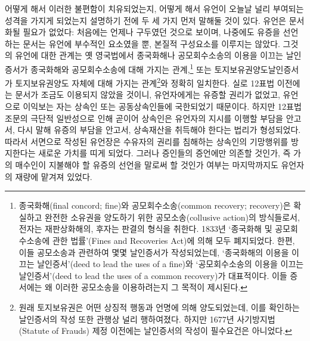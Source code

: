 어떻게 해서 이러한 불편함이 치유되었는지,
어떻게 해서 유언이 오늘날 널리 부여되는 성격을 가지게 되었는지
설명하기 전에
두 세 가지 먼저 말해둘 것이 있다.
유언은 문서화될 필요가 없었다:
처음에는 언제나 구두였던 것으로 보이며,
나중에도 유증을 선언하는 문서는 유언에 부수적인 요소였을 뿐,
본질적 구성요소를 이루지는 않았다.
그것의 유언에 대한 관계는
옛 영국법에서
종국화해나
공모회수소송의
이용을 이끄는 날인증서가
종국화해와
공모회수소송에
대해 가지는 관계,\footnote{%
  종국화해(final concord; fine)와 공모회수소송(common recovery; recovery)은
  확실하고 완전한 소유권을 양도하기 위한
  공모소송(collusive action)의 방식들로서,
  전자는 재판상화해의, 후자는 판결의 형식을 취한다.
  1833년 `종국화해 및 공모회수소송에 관한 법률'(Fines and Recoveries Act)에
  의해 모두 폐지되었다.
  한편, 이들 공모소송과 관련하여 몇몇 날인증서가 작성되었는데,
  `종국화해의 이용을 이끄는 날인증서'(deed to lead the uses of a fine)와
  `공모회수소송의 이용을 이끄는
  날인증서'(deed to lead the uses of a common recovery)가 대표적이다.
  이들 증서에는 왜 이러한 공모소송을 이용하려는지 그 목적이 제시된다.
}
또는
토지보유권양도날인증서가
토지보유권양도 자체에 대해 가지는 관계\footnote{%
  원래 토지보유권은 어떤 상징적 행동과 언명에 의해 양도되었는데,
  이를 확인하는 날인증서의 작성 또한 관행상 널리 행하여졌다.
  하지만 1677년 사기방지법(Statute of Frauds) 제정 이전에는
  날인증서의 작성이 필수요건은 아니었다.
}와
정확히 일치한다.
실로 12표법 이전에는 문서가 조금도 이용되지 않았을 것이니,
유언자에게는 유증할 권리가 없었고,
유언으로 이익보는 자는 상속인 또는 공동상속인들에 국한되었기 때문이다.
하지만 12표법 조문의 극단적 일반성으로 인해
곧이어
상속인은 유언자의 지시를 이행할 부담을 안고서,
다시 말해 유증의 부담을 안고서,
상속재산을 취득해야 한다는 법리가
형성되었다.
따라서 서면으로 작성된 유언장은
수유자의 권리를 침해하는 상속인의 기망행위를
방지한다는 새로운 가치를 띠게 되었다.
그러나
증인들의 증언에만 의존할 것인가, 즉
가의 매수인이 지불해야 할 유증의 선언을 말로써 할 것인가 여부는
마지막까지도 유언자의 재량에 맡겨져 있었다.

